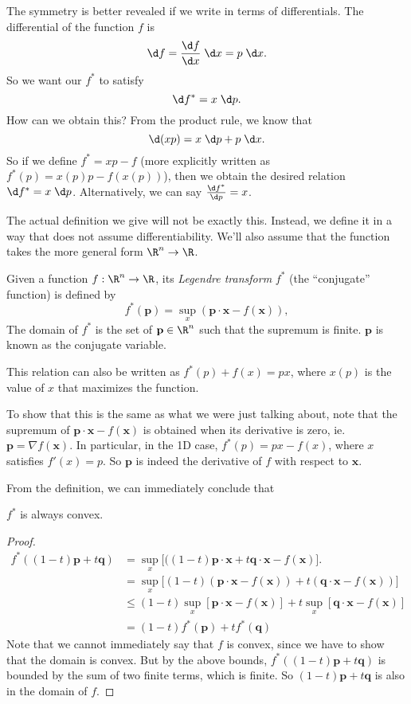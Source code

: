 \documentclass[a4paper]{article}
\begin{document}
The symmetry is better revealed if we write in terms of differentials. The differential of the function $f$ is
\[
  \d f = \frac{\d f}{\d x}\;\d x = p\;\d x.
\]
So we want our $f^*$ to satisfy
\[
  \d f^* = x\;\d p.
\]
How can we obtain this? From the product rule, we know that
\[
  \d (xp) = x\;\d p + p\;\d x.
\]
So if we define $f^* = xp - f$ (more explicitly written as $f^*(p) = x(p)p - f(x(p))$), then we obtain the desired relation $\d f^* = x\;\d p$. Alternatively, we can say $\frac{\d f^*}{\d p} = x$.

The actual definition we give will not be exactly this. Instead, we define it in a way that does not assume differentiability. We'll also assume that the function takes the more general form $\R^n \to \R$.
\begin{defi}
  Given a function $f: \R^n \to \R$, its \emph{Legendre transform} $f^*$ (the ``conjugate'' function) is defined by
  \[
    f^*(\mathbf{p}) = \sup_{x}(\mathbf{p}\cdot \mathbf{x} - f(\mathbf{x})),
  \]
  The domain of $f^*$ is the set of $\mathbf{p}\in \R^n$ such that the supremum is finite. $\mathbf{p}$ is known as the conjugate variable.
\end{defi}
This relation can also be written as $f^*(p) + f(x) = px$, where $x(p)$ is the value of $x$ that maximizes the function.

To show that this is the same as what we were just talking about, note that the supremum of $\mathbf{p}\cdot \mathbf{x} - f(\mathbf{x})$ is obtained when its derivative is zero, ie. $\mathbf{p} = \nabla f(\mathbf{x})$. In particular, in the 1D case, $f^*(p) = px - f(x)$, where $x$ satisfies $f'(x) = p$. So $\mathbf{p}$ is indeed the derivative of $f$ with respect to $\mathbf{x}$.

From the definition, we can immediately conclude that
\begin{lemma}
  $f^*$ is always convex.
\end{lemma}

\begin{proof}
  \begin{align*}
    f^*((1 - t)\mathbf{p} + t\mathbf{q}) &= \sup_x \big[((1 - t)\mathbf{p}\cdot \mathbf{x} + t\mathbf{q}\cdot \mathbf{x} - f(\mathbf{x})\big].\\
    &= \sup_x \big[(1 - t)(\mathbf{p}\cdot \mathbf{x} - f(\mathbf{x})) + t(\mathbf{q}\cdot \mathbf{x} - f(\mathbf{x}))\big]\\
    &\leq (1 - t)\sup_x [\mathbf{p}\cdot \mathbf{x} - f(\mathbf{x})] + t\sup_x[\mathbf{q}\cdot \mathbf{x} - f(\mathbf{x})]\\
    &= (1 - t)f^*(\mathbf{p}) + tf^*(\mathbf{q})
  \end{align*}
  Note that we cannot immediately say that $f$ is convex, since we have to show that the domain is convex. But by the above bounds, $f^*((1 - t)\mathbf{p} + t\mathbf{q})$ is bounded by the sum of two finite terms, which is finite. So $(1 - t)\mathbf{p} + t\mathbf{q}$ is also in the domain of $f$.
\end{proof}
\end{document}

